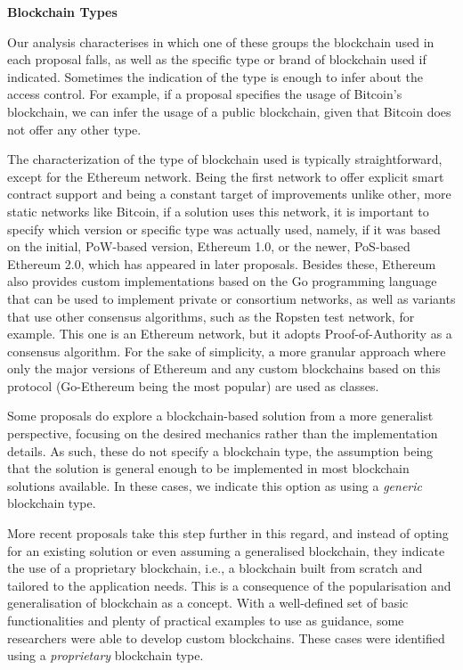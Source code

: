 \documentclass[../access.tex]{subfiles}
\begin{document}
    \par
    \textbf{Blockchain Types}
    \par
        Our analysis characterises in which one of these groups the blockchain used in each proposal falls, as well as the specific type or brand of blockchain used if indicated. Sometimes the indication of the type is enough to infer about the access control. For example, if a proposal specifies the usage of Bitcoin's blockchain, we can infer the usage of a public blockchain, given that Bitcoin does not offer any other type.
		\par
        The characterization of the type of blockchain used is typically straightforward, except for the Ethereum network. Being the first network to offer explicit smart contract support and being a constant target of improvements unlike other, more static networks like Bitcoin, if a solution uses this network, it is important to specify which version or specific type was actually used, namely, if it was based on the initial, PoW-based version, Ethereum 1.0, or the newer, PoS-based Ethereum 2.0, which has appeared in later proposals. Besides these, Ethereum also provides custom implementations based on the Go programming language that can be used to implement private or consortium networks, as well as variants that use other consensus algorithms, such as the Ropsten test network, for example. This one is an Ethereum network, but it adopts Proof-of-Authority as a consensus algorithm. For the sake of simplicity, a more granular approach where only the major versions of Ethereum and any custom blockchains based on this protocol (Go-Ethereum being the most popular) are used as classes.
		\par
        Some proposals do explore a blockchain-based solution from a more generalist perspective, focusing on the desired mechanics rather than the implementation details. As such, these do not specify a blockchain type, the assumption being that the solution is general enough to be implemented in most blockchain solutions available. In these cases, we indicate this option as using a \textit{generic} blockchain type.
        \par
        More recent proposals take this step further in this regard, and instead of opting for an existing solution or even assuming a generalised blockchain, they indicate the use of a proprietary blockchain, i.e., a blockchain built from scratch and tailored to the application needs. This is a consequence of the popularisation and generalisation of blockchain as a concept. With a well-defined set of basic functionalities and plenty of practical examples to use as guidance, some researchers were able to develop custom blockchains. These cases were identified using a \textit{proprietary} blockchain type.
\end{document}
